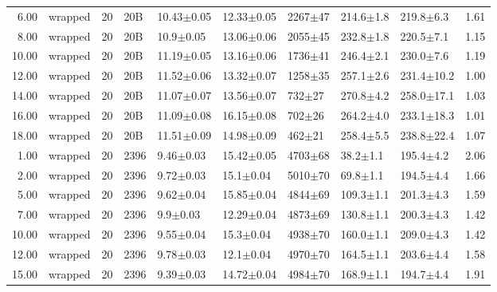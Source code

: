 \begin{table}
\begin{tabular}{rlrllllllr}
      6.00 &       wrapped &      20 &     20B &       10.43$\pm$0.05 &   12.33$\pm$0.05 &  2267$\pm$47 &   214.6$\pm$1.8 &   219.8$\pm$6.3 &        1.61 \\
      8.00 &       wrapped &      20 &     20B &        10.9$\pm$0.05 &   13.06$\pm$0.06 &  2055$\pm$45 &   232.8$\pm$1.8 &   220.5$\pm$7.1 &        1.15 \\
     10.00 &       wrapped &      20 &     20B &       11.19$\pm$0.05 &   13.16$\pm$0.06 &  1736$\pm$41 &   246.4$\pm$2.1 &   230.0$\pm$7.6 &        1.19 \\
     12.00 &       wrapped &      20 &     20B &       11.52$\pm$0.06 &   13.32$\pm$0.07 &  1258$\pm$35 &   257.1$\pm$2.6 &  231.4$\pm$10.2 &        1.00 \\
     14.00 &       wrapped &      20 &     20B &       11.07$\pm$0.07 &   13.56$\pm$0.07 &   732$\pm$27 &   270.8$\pm$4.2 &  258.0$\pm$17.1 &        1.03 \\
     16.00 &       wrapped &      20 &     20B &       11.09$\pm$0.08 &   16.15$\pm$0.08 &   702$\pm$26 &   264.2$\pm$4.0 &  233.1$\pm$18.3 &        1.01 \\
     18.00 &       wrapped &      20 &     20B &       11.51$\pm$0.09 &   14.98$\pm$0.09 &   462$\pm$21 &   258.4$\pm$5.5 &  238.8$\pm$22.4 &        1.07 \\
      1.00 &       wrapped &      20 &    2396 &        9.46$\pm$0.03 &   15.42$\pm$0.05 &  4703$\pm$68 &    38.2$\pm$1.1 &   195.4$\pm$4.2 &        2.06 \\
      2.00 &       wrapped &      20 &    2396 &        9.72$\pm$0.03 &    15.1$\pm$0.04 &  5010$\pm$70 &    69.8$\pm$1.1 &   194.5$\pm$4.4 &        1.66 \\
      5.00 &       wrapped &      20 &    2396 &        9.62$\pm$0.04 &   15.85$\pm$0.04 &  4844$\pm$69 &   109.3$\pm$1.1 &   201.3$\pm$4.3 &        1.59 \\
      7.00 &       wrapped &      20 &    2396 &         9.9$\pm$0.03 &   12.29$\pm$0.04 &  4873$\pm$69 &   130.8$\pm$1.1 &   200.3$\pm$4.3 &        1.42 \\
     10.00 &       wrapped &      20 &    2396 &        9.55$\pm$0.04 &    15.3$\pm$0.04 &  4938$\pm$70 &   160.0$\pm$1.1 &   209.0$\pm$4.3 &        1.42 \\
     12.00 &       wrapped &      20 &    2396 &        9.78$\pm$0.03 &    12.1$\pm$0.04 &  4970$\pm$70 &   164.5$\pm$1.1 &   203.6$\pm$4.4 &        1.58 \\
     15.00 &       wrapped &      20 &    2396 &        9.39$\pm$0.03 &   14.72$\pm$0.04 &  4984$\pm$70 &   168.9$\pm$1.1 &   194.7$\pm$4.4 &        1.91 \\

\end{tabular}
\end{table}
